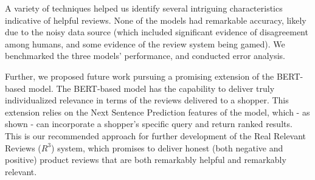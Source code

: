 \documentclass[10pt, a4paper, twocolumn]{article}
\begin{document}
A variety of techniques helped us identify several intriguing characteristics indicative of helpful reviews. None of the models had remarkable accuracy, likely due to the noisy data source (which included significant evidence of disagreement among humans, and some evidence of the review system being gamed).  We benchmarked the three models’ performance, and conducted error analysis.

Further, we proposed future work pursuing a promising extension of the BERT-based model. The BERT-based model has the capability to deliver truly individualized relevance in terms of the reviews delivered to a shopper. This extension relies on the Next Sentence Prediction features of the model, which - as shown - can incorporate a shopper’s specific query and return ranked results. This is our recommended approach for further development of the Real Relevant Reviews ($R^3$) system, which promises to deliver honest (both negative and positive) product reviews that are both remarkably helpful and remarkably relevant.
\end{document}
